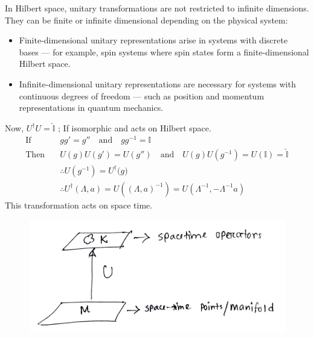 \documentclass[14pt]{article} %
\begin{document}
\begin{tcolorbox}[proofbox, title=\textbf{Note: Dimension of Unitary Transformation in Hilbert Space}]
In Hilbert space, unitary transformations are not restricted to infinite dimensions. They can be finite or infinite dimensional depending on the physical system:

\begin{itemize}
    \item Finite-dimensional unitary representations arise in systems with discrete bases — for example, spin systems where spin states form a finite-dimensional Hilbert space.
    \item Infinite-dimensional unitary representations are necessary for systems with continuous degrees of freedom — such as position and momentum representations in quantum mechanics.
\end{itemize}
\end{tcolorbox}
Now, $U^\dagger U = \hat{\mathbb{I}}$ ; If isomorphic and acts on Hilbert space.
\begin{align*}
    \text{If}\quad &gg'=g'' \quad \text{and} \quad gg^{-1}=\mathbb{I} \\
    \text{Then} \quad & U(g)U(g') = U(g'') \quad \text{and} \quad U(g)U(g^{-1}) = U(\mathbb{I}) = \hat{\mathbb{I}} \\
    &\therefore U(g^{-1}) = U^{\dagger}{(g})\\
    &\therefore U^\dagger(\Lambda,a)=U\left((\Lambda,a)^{-1}\right)=U(\Lambda^{-1},-\Lambda^{-1}a)  \tag{4.5} \label{eq:4.5}
\end{align*}
This transformation acts on space time.
\begin{figure}[H]
\centering
\includegraphics[width=0.7\linewidth]{L1_1.jpg}
\caption*{}
\end{figure}
\end{document}
